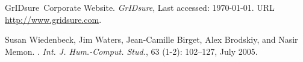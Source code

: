 \documentclass[conference]{IEEEtran}
\begin{document}
\begin{thebibliography}{23}
GrIDsure~Corporate Website.
\newblock \emph{GrIDsure}, Last accessed: \today{}.
\newblock URL \url{http://www.gridsure.com}.

Susan Wiedenbeck, Jim Waters, Jean-Camille Birget, Alex Brodskiy, and Nasir
  Memon.
.
\newblock \emph{Int. J. Hum.-Comput. Stud.}, 63 (1-2):
  102--127, July 2005.

\end{thebibliography}
\end{document}
